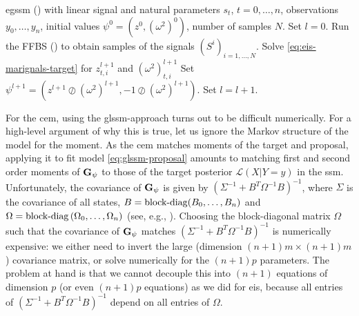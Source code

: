 \begin{algorithm}
    \caption{\gls{eis} for \glspl{egssm} with linear signal}
    \label{alg:eis}
    \begin{algorithmic}[1]
        \Require \gls{egssm} () with linear signal and natural parameters $s_{t}$, $t = 0, \dots, n$, observations $y_{0}, \dots, y_{n}$, initial values $\psi^{0} = \left( z^{0}, (\omega^{2})^{0} \right)$, number of samples $N$.
        \State Set $l = 0$.
        \Repeat
            \State Run the FFBS () to obtain samples of the signals $(S^{i})_{i = 1, \dots, N}$. 
                    \State Solve \eqref{eq:eis-marignals-target} for $z^{l + 1}_{t,i}$ and $(\omega^{2})^{l + 1}_{t,i}$ 
                \EndFor
            \EndFor
            \State Set $\psi^{l + 1} = \left( z^{l + 1} \oslash (\omega^{2})^{l + 1}, -1 \oslash (\omega^{2})^{l + 1}\right)$.
            \State Set $l = l +1$.
        
    \end{algorithmic}
\end{algorithm}

For the \gls{cem}, using the \gls{glssm}-approach turns out to be difficult numerically. For a high-level argument of why this is true, let us ignore the Markov structure of the model for the moment. As the \gls{cem} matches moments of the target and proposal, applying it to fit model \eqref{eq:glssm-proposal} amounts to matching first and second order moments of $\mathbf G_{\psi}$ to those of the target posterior $\mathcal L (X | Y = y)$ in the \gls{ssm}. Unfortunately, the covariance of $\mathbf G_{\psi}$ is given by $ \left( \Sigma^{-1} + B^{T}\Omega^{-1} B \right)^{-1}$, where $\Sigma$ is the covariance of all states, $B = \operatorname{block-diag} (B_{0}, \dots, B_{n})$ and $\Omega = \operatorname{block-diag} \left( \Omega_{0}, \dots, \Omega_{n} \right)$ (see, e.g., \citep[Section 4.13]{Durbin2012Time}). Choosing the block-diagonal matrix $\Omega$ such that the covariance of $\mathbf G_{\psi}$ matches $ \left( \Sigma^{-1} + B^{T}\Omega^{-1}B \right) ^{-1}$ is numerically expensive: we either need to invert the large (dimension $(n + 1)m \times (n + 1)m$) covariance matrix, or solve numerically for the $(n + 1)p$ parameters. The problem at hand is that we cannot decouple this into $(n + 1)$ equations of dimension $p$ (or even $(n+1)p$ equations) as we did for \gls{eis}, because all entries of $(\Sigma^{-1} + B^{T}\Omega^{-1} B)^{-1}$ depend on all entries of $\Omega$. 

